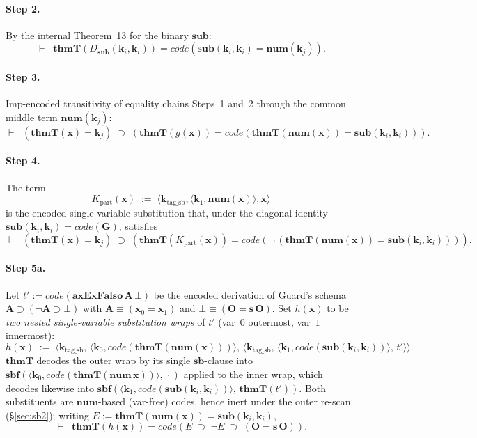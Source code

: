 \documentclass[11pt]{article}
\theoremstyle{plain}
\theoremstyle{definition}
\theoremstyle{remark}
\newcommand{\code}[1]{\mathit{code}(#1)}
\newcommand{\sub}{\mathbf{sub}}
\newcommand{\sbf}{\mathbf{sbf}}
\newcommand{\thmT}{\mathbf{thmT}}
\newcommand{\num}{\mathbf{num}}
\newcommand{\seq}[1]{\langle #1 \rangle}
\begin{document}
\paragraph{Step 2.}  By the internal Theorem~13 for the binary
$\sub$:
\[
\vdash \;\;\thmT(D_\sub(\mathbf{k}_i, \mathbf{k}_i)) = \code{\sub(\mathbf{k}_i, \mathbf{k}_i) = \num(\mathbf{k}_j)}.
\]

\paragraph{Step 3.}  Imp-encoded transitivity of equality chains
Steps~1 and~2 through the common middle term $\num(\mathbf{k}_j)$:
\[
\vdash \;\;(\thmT(\mathbf{x}) = \mathbf{k}_j) \;\supset\; (\thmT(g(\mathbf{x})) = \code{\thmT(\num(\mathbf{x})) = \sub(\mathbf{k}_i, \mathbf{k}_i)}).
\]

\paragraph{Step 4.}  The term
\[
K_{\mathrm{part}}(\mathbf{x}) \;:=\; \seq{\mathbf{k}_{\mathrm{tag\_sb}}, \seq{\mathbf{k}_1, \num(\mathbf{x})}, \mathbf{x}}
\]
is the encoded single-variable substitution that, under the diagonal
identity $\sub(\mathbf{k}_i, \mathbf{k}_i) = \code{\mathbf{G}}$,
satisfies
\[
\vdash \;\;(\thmT(\mathbf{x}) = \mathbf{k}_j) \;\supset\; (\thmT(K_{\mathrm{part}}(\mathbf{x})) = \code{\neg\,(\thmT(\num(\mathbf{x})) = \sub(\mathbf{k}_i, \mathbf{k}_i))}).
\]

\paragraph{Step 5a.}  Let $t' := \code{\mathbf{axExFalso}\,\mathbf{A}\,\bot}$
be the encoded derivation of Guard's schema $\mathbf{A} \supset
(\neg \mathbf{A} \supset \bot)$ with $\mathbf{A} \equiv (\mathbf{x}_0
= \mathbf{x}_1)$ and $\bot \equiv (\mathbf{O} = \mathbf{s}\,\mathbf{O})$.
Set $h(\mathbf{x})$ to be \emph{two nested single-variable substitution
wraps} of $t'$ (var~$0$ outermost, var~$1$ innermost):
\[
h(\mathbf{x}) \;:=\; \seq{\mathbf{k}_{\mathrm{tag\_sb}},\, \seq{\mathbf{k}_0, \code{\thmT(\num(\mathbf{x}))}},\,
   \seq{\mathbf{k}_{\mathrm{tag\_sb}},\, \seq{\mathbf{k}_1, \code{\sub(\mathbf{k}_i, \mathbf{k}_i)}},\, t'}}.
\]
$\thmT$ decodes the outer wrap by its single $\mathbf{sb}$-clause into
$\sbf(\seq{\mathbf{k}_0, \code{\thmT(\num\,\mathbf{x})}},\, \cdot)$ applied to
the inner wrap, which decodes likewise into
$\sbf(\seq{\mathbf{k}_1, \code{\sub(\mathbf{k}_i,\mathbf{k}_i)}},\, \thmT(t'))$.
Both substituents are $\num$-based (var-free) codes, hence inert under the
outer re-scan ({\S}\ref{sec:sb2}); writing
$E := \thmT(\num(\mathbf{x})) = \sub(\mathbf{k}_i, \mathbf{k}_i)$,
\[
\vdash \;\;\thmT(h(\mathbf{x})) = \code{E \;\supset\; \neg E \;\supset\; (\mathbf{O} = \mathbf{s}\,\mathbf{O})}.
\]
\end{document}

